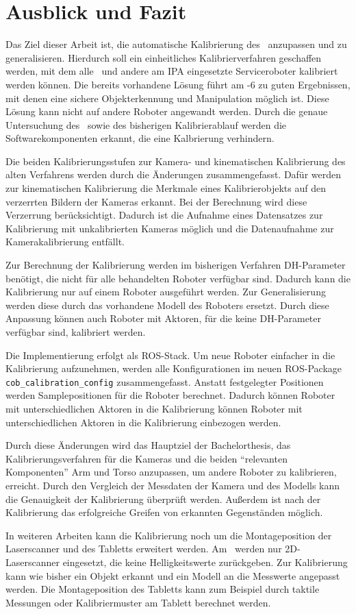 \chapter{Ausblick und Fazit}

Das Ziel dieser Arbeit ist, die automatische Kalibrierung des \cob\ anzupassen 
und zu generalisieren. Hierdurch soll ein einheitliches Kalibrierverfahren 
geschaffen werden, mit dem alle \cob\ und andere am \ac{IPA} eingesetzte 
Serviceroboter kalibriert werden können. Die bereits vorhandene Lösung führt am
-6 zu guten Ergebnissen, mit denen eine sichere Objekterkennung und
Manipulation möglich ist. Diese Lösung kann nicht auf andere Roboter angewandt
werden. Durch die genaue Untersuchung des \cob\ sowie des bisherigen
Kalibrierablauf werden die Softwarekomponenten erkannt, die eine Kalbrierung 
verhindern. 

Die beiden Kalibrierungsstufen zur Kamera- und kinematischen Kalibrierung  des
alten Verfahrens werden durch die Änderungen zusammengefasst. Dafür werden zur 
kinematischen Kalibrierung die Merkmale eines Kalibrierobjekts auf den
verzerrten Bildern der Kameras erkannt. Bei der Berechnung wird diese
Verzerrung berücksichtigt. Dadurch ist die Aufnahme eines Datensatzes zur
Kalibrierung mit unkalibrierten Kameras möglich und die Datenaufnahme zur
Kamerakalibrierung entfällt. 

Zur Berechnung der Kalibrierung werden im bisherigen Verfahren \ac{DH-Parameter}
benötigt, die nicht für alle behandelten Roboter verfügbar sind. Dadurch 
kann die Kalibrierung nur auf einem Roboter ausgeführt werden. Zur Generalisierung
werden diese durch das vorhandene Modell des Roboters ersetzt. Durch diese 
Anpassung können auch Roboter mit Aktoren, für die keine \ac{DH-Parameter} 
verfügbar sind, kalibriert werden.

Die Implementierung erfolgt als \ac{ROS}-Stack. Um neue Roboter einfacher in 
die Kalibrierung aufzunehmen, werden alle Konfigurationen im neuen
\ac{ROS}-Package \texttt{cob\_calibration\_config} zusammengefasst.
Anstatt festgelegter Positionen werden Samplepositionen für die Roboter berechnet.  
Dadurch können Roboter mit unterschiedlichen Aktoren in die Kalibrierung
können Roboter mit unterschiedlichen Aktoren in die Kalibrierung einbezogen 
werden.


Durch diese Änderungen wird das Hauptziel der Bachelorthesis, das Kalibrierungsverfahren für die Kameras und
die beiden ``relevanten Komponenten''\cite{shaug} Arm und Torso anzupassen, um andere Roboter
zu kalibrieren, erreicht.
Durch den Vergleich der
Messdaten der Kamera und des Modells kann die Genauigkeit der Kalibrierung 
überprüft werden. Außerdem ist nach der Kalibrierung das erfolgreiche Greifen 
von erkannten Gegenständen möglich. 

In weiteren Arbeiten kann die Kalibrierung noch um die Montageposition der
Laserscanner und des Tabletts erweitert werden. Am \cob\ werden nur 2D-Laserscanner
eingesetzt, die keine Helligkeitswerte zurückgeben. Zur Kalibrierung kann wie 
bisher ein Objekt erkannt und ein Modell an die Messwerte angepasst werden.
Die Montageposition des Tabletts kann zum Beispiel durch taktile Messungen oder
Kalibriermuster am Tablett berechnet werden.

